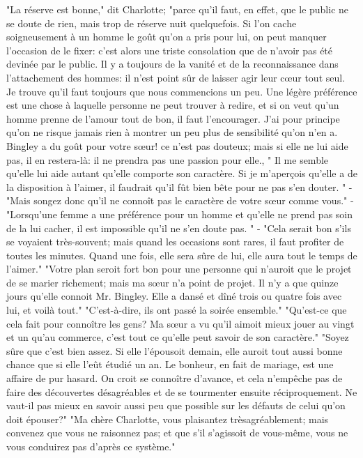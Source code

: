 "La réserve est bonne," dit Charlotte; "parce qu'il faut, en effet, que le public ne se doute de rien, mais trop de réserve nuit quelquefois. Si l'on cache soigneusement à un homme le goût qu'on a pris pour lui,\setcounter{page}{381} on peut manquer l'occasion de le fixer: c'est alors une triste consolation que de n'avoir pas été devinée par le public. Il y a toujours de la vanité et de la reconnaissance dans l'attachement des hommes: il n'est point sûr de laisser agir leur cœur tout seul. Je trouve qu'il faut toujours que nous commencions un peu. Une légère préférence est une chose à laquelle personne ne peut trouver à redire, et si on veut qu'un homme prenne de l'amour tout de bon, il faut l'encourager. J'ai pour principe qu'on ne risque jamais rien à montrer un peu plus de sensibilité qu'on n'en a. Bingley a du goût pour votre sœur! ce n'est pas douteux; mais si elle ne lui aide pas, il en restera-là: il ne prendra pas une passion pour elle.,
" Il me semble qu'elle lui aide autant qu'elle comporte son caractère. Si je m'aperçois qu'elle a de la disposition à l'aimer, il faudrait qu'il fût bien bête pour ne pas s'en douter. "
- "Mais songez donc qu'il ne connoît pas le caractère de votre sœur comme vous."
- "Lorsqu'une femme a une préférence pour un homme et qu'elle ne prend pas soin de la lui cacher, il est impossible qu'il ne s'en doute pas. "
- "Cela serait bon s'ils se voyaient très-souvent;\setcounter{page}{382} mais quand les occasions sont rares, il faut profiter de toutes les minutes. Quand une fois, elle sera sûre de lui, elle aura tout le temps de l'aimer."
"Votre plan seroit fort bon pour une personne qui n'auroit que le projet de se marier richement; mais ma sœur n'a point de projet. Il n'y a que quinze jours qu'elle connoit Mr. Bingley. Elle a dansé et dîné trois ou quatre fois avec lui, et voilà tout."
"C'est-à-dire, ils ont passé la soirée ensemble."
"Qu'est-ce que cela fait pour connoître les gens? Ma sœur a vu qu'il aimoit mieux jouer au vingt et un qu'au commerce, c'est tout ce qu'elle peut savoir de son caractère."
"Soyez sûre que c'est bien assez. Si elle l'épousoit demain, elle auroit tout aussi bonne chance que si elle l'eût étudié un an. Le bonheur, en fait de mariage, est une affaire de pur hasard. On croit se connoître d'avance, et cela n'empêche pas de faire des découvertes désagréables et de se tourmenter ensuite réciproquement. Ne vaut-il pas mieux en savoir aussi peu que possible sur les défauts de celui qu'on doit épouser?"
"Ma chère Charlotte, vous plaisantez trèsagréablement; mais convenez que vous ne raisonnez pas; et que s'il s'agissoit de vous-même,\setcounter{page}{383} vous ne vous conduirez pas d’après ce système."

